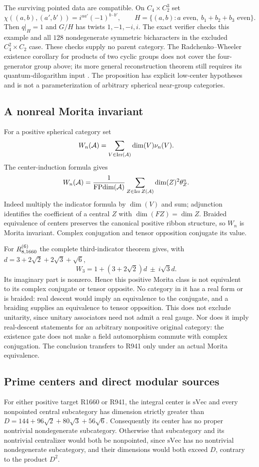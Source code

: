 The surviving pointed data are compatible. On $C_4\times C_2^3$ set
\[
\chi((a,b),(a',b'))=i^{aa'}(-1)^{b\cdot b'},\qquad
H=\{(a,b):a\text{ even},\ b_1+b_2+b_3\text{ even}\}.
\]
Then $q|_H=1$ and $G/H$ has twists $1,-1,-i,i$. The exact verifier checks
this example and all $128$ nondegenerate symmetric bicharacters in the
excluded $C_4^2\times C_2$ case. These checks supply no parent category.
The Radchenko--Wheeler existence corollary for products of two cyclic
groups does not cover the four-generator group above; its more general
reconstruction theorem still requires its quantum-dilogarithm input
\cite[Section~5.4, Theorem~12 and Corollary~6]{RWParent}.
The proposition has explicit low-center hypotheses and is not a
parameterization of arbitrary spherical near-group categories.

\subsection{A nonreal Morita invariant}
\label{sec:r1660-nonreal-morita}
For a positive spherical category set
\[
W_n(\mathcal A)=\sum_{V\in\operatorname{Irr}(\mathcal A)}\dim(V)\nu_n(V).
\]
The center-induction formula \cite{NS} gives
\[
W_n(\mathcal A)=\frac{1}{\operatorname{FPdim}(\mathcal A)}
 \sum_{Z\in\operatorname{Irr} Z(\mathcal A)}\dim(Z)^2\theta_Z^n.
\]
Indeed multiply the indicator formula by $\dim(V)$ and sum; adjunction
identifies the coefficient of a central $Z$ with $\dim(FZ)=\dim Z$.
Braided equivalence of centers preserves the canonical positive ribbon
structure, so $W_n$ is Morita invariant. Complex conjugation and tensor
opposition conjugate its value.

For $R^{(6)}_{8,1660}$ the complete third-indicator theorem gives, with
$d=3+2\sqrt2+2\sqrt3+\sqrt6$,
\[
W_3=1+(3+2\sqrt2)d\ \mathbin{\pm}\ i\sqrt3d.
\]
Its imaginary part is nonzero. Hence this positive Morita class is not
equivalent to its complex conjugate or tensor opposite. No category in
it has a real form or is braided: real descent would imply an equivalence
to the conjugate, and a braiding supplies an equivalence to tensor
opposition. This does not exclude unitarity, since unitary associators
need not admit a real gauge. Nor does it imply real-descent statements
for an arbitrary nonpositive original category: the existence gate
does not make a field automorphism commute with complex conjugation.
The conclusion transfers to R941 only under an actual Morita equivalence.

\subsection{Prime centers and direct modular sources}
\label{sec:r1660-direct-sources}
For either positive target R1660 or R941, the integral center is
$\mathrm{sVec}$ and every nonpointed central subcategory has dimension
strictly greater than $D=144+96\sqrt2+80\sqrt3+56\sqrt6$.
Consequently its center has no proper nontrivial nondegenerate
subcategory. Otherwise that subcategory and its nontrivial centralizer
would both be nonpointed, since $\mathrm{sVec}$ has no nontrivial
nondegenerate subcategory, and their dimensions would both exceed $D$,
contrary to the product $D^2$.

